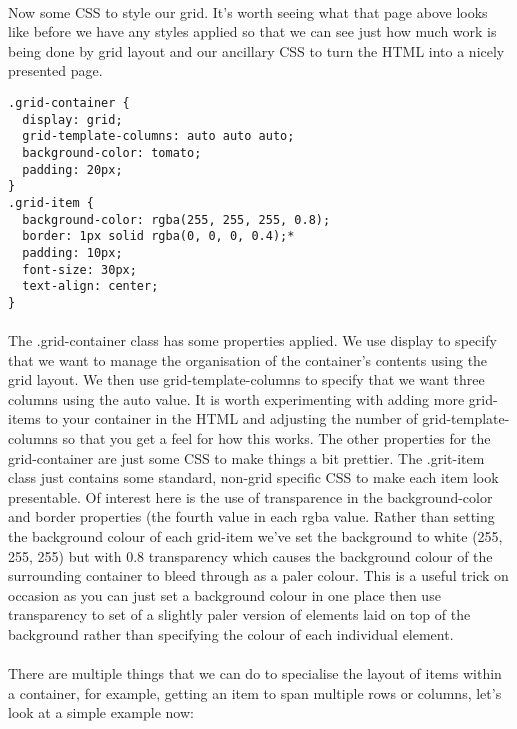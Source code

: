 \documentclass[10pt, a4paper]{article}
\begin{document}
\paragraph{} Now some CSS to style our grid. It's worth seeing what that page above looks like before we have any styles applied so that we can see just how much work is being done by grid layout and our ancillary CSS to turn the HTML into a nicely presented page.
\begin{lstlisting}
.grid-container {
  display: grid;
  grid-template-columns: auto auto auto;
  background-color: tomato;
  padding: 20px;
}
.grid-item {
  background-color: rgba(255, 255, 255, 0.8);
  border: 1px solid rgba(0, 0, 0, 0.4);*
  padding: 10px;
  font-size: 30px;
  text-align: center;
}
\end{lstlisting}
\paragraph{} The .grid-container class has some properties applied. We use display to specify that we want to manage the organisation of the container's contents using the grid layout. We then use grid-template-columns to specify that we want three columns using the auto value. It is worth experimenting with adding more grid-items to your container in the HTML and adjusting the number of grid-template-columns so that you get a feel for how this works. The other properties for the grid-container are just some CSS to make things a bit prettier. The .grit-item class just contains some standard, non-grid specific CSS to make each item look presentable. Of interest here is the use of transparence in the background-color and border properties (the fourth value in each rgba value. Rather than setting the background colour of each grid-item we've set the background to white (255, 255, 255) but with 0.8 transparency which causes the background colour of the surrounding container to bleed through as a paler colour. This is a useful trick on occasion as you can just set a background colour in one place then use transparency to set of a slightly paler version of elements laid on top of the background rather than specifying the colour of each individual element.

\paragraph{} There are multiple things that we can do to specialise the layout of items within a container, for example, getting an item to span multiple rows or columns, let's look at a simple example now:
\end{document}
